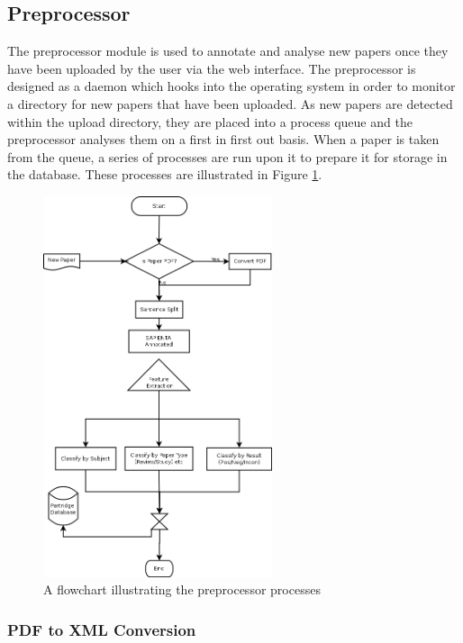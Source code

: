 \subsection{ Preprocessor }

The preprocessor module is used to annotate and analyse new papers once they
have been uploaded by the user via the web interface. The preprocessor is
designed as a daemon which hooks into the operating system in order to monitor
a directory for new papers that have been uploaded. As new papers are detected
within the upload directory, they are placed into a process queue and the
preprocessor analyses them on a first in first out basis. When a paper is taken
from the queue, a series of processes are run upon it to prepare it for storage
in the database. These processes are illustrated in Figure
\ref{fig:flow_preprocessor}.

\begin{figure}[!h]
\centering
\includegraphics[width=0.6\textwidth]{images/design/flow_preprocessor.png}
\caption{A flowchart illustrating the preprocessor processes}
\label{fig:flow_preprocessor}
\end{figure}

\subsubsection{PDF to XML Conversion}

